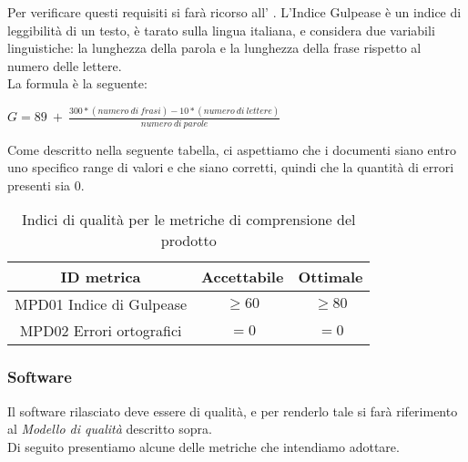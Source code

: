 \documentclass[../piano_di_qualifica.tex]{subfiles}
\begin{document}
Per verificare questi requisiti si farà ricorso all’ . L'Indice Gulpease è un indice di leggibilità di un testo, è tarato sulla lingua italiana, e considera due variabili linguistiche: la lunghezza della parola e la lunghezza della frase rispetto al numero delle lettere.\\
La formula è la seguente:\par
\begin{center}
	$G = 89\ +\ \frac{300 * (numero\ di\ frasi) - 10 * (numero\ di\ lettere)}{numero\ di\ parole} $
\end{center}
Come descritto nella seguente tabella, ci aspettiamo che i documenti siano entro uno specifico range di valori e che siano corretti, quindi che la quantità di errori presenti sia 0. \par

\begin{table}[!ht]
	\centering
	\begin{tabular}{|c|c|c|}
		\hline
		\rowcolor{lightgray}
		\textbf{ID metrica}      & \textbf{Accettabile} & \textbf{ Ottimale} \\
		\hline
		MPD01 Indice di Gulpease & \(\ge 60\)                  & \(\ge 80\)                  \\
		MPD02 Errori ortografici & \(= 0\)                     & \(= 0\)                     \\
		\hline
	\end{tabular}
	\caption{Indici di qualità per le metriche di comprensione del prodotto}
\end{table}


\subsubsection{Software}
Il software rilasciato deve essere di qualità, e per renderlo tale si farà riferimento al \emph{Modello di qualità} descritto sopra. \\
Di seguito presentiamo alcune delle metriche che intendiamo adottare. \\
\end{document}
